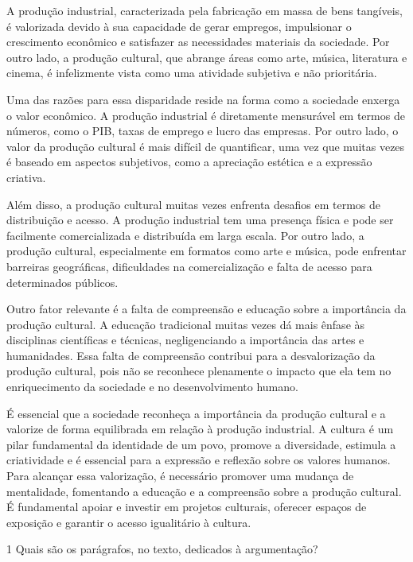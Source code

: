 \begin{itemize}
\begin{itemize}
{\begin{itemize}
\begin{itemize}
\begin{escolha}
\begin{escolha}
\begin{escolha}
\begin{escolha}
\begin{escolha}
\begin{escolha}
\begin{escolha}
\begin{escolha}
A produção industrial, caracterizada pela fabricação em massa de bens
tangíveis, é valorizada devido à sua capacidade de gerar empregos,
impulsionar o crescimento econômico e satisfazer as necessidades
materiais da sociedade. Por outro lado, a produção cultural, que abrange
áreas como arte, música, literatura e cinema, é infelizmente vista como
uma atividade subjetiva e não prioritária.

Uma das razões para essa disparidade reside na forma como a sociedade
enxerga o valor econômico. A produção industrial é diretamente
mensurável em termos de números, como o PIB, taxas de emprego e lucro
das empresas. Por outro lado, o valor da produção cultural é mais
difícil de quantificar, uma vez que muitas vezes é baseado em aspectos
subjetivos, como a apreciação estética e a expressão criativa.

Além disso, a produção cultural muitas vezes enfrenta desafios em termos
de distribuição e acesso. A produção industrial tem uma presença física
e pode ser facilmente comercializada e distribuída em larga escala. Por
outro lado, a produção cultural, especialmente em formatos como arte e
música, pode enfrentar barreiras geográficas, dificuldades na
comercialização e falta de acesso para determinados públicos.

Outro fator relevante é a falta de compreensão e educação sobre a
importância da produção cultural. A educação tradicional muitas vezes dá
mais ênfase às disciplinas científicas e técnicas, negligenciando a
importância das artes e humanidades. Essa falta de compreensão contribui
para a desvalorização da produção cultural, pois não se reconhece
plenamente o impacto que ela tem no enriquecimento da sociedade e no
desenvolvimento humano.

É essencial que a sociedade reconheça a importância da produção cultural
e a valorize de forma equilibrada em relação à produção industrial. A
cultura é um pilar fundamental da identidade de um povo, promove a
diversidade, estimula a criatividade e é essencial para a expressão e
reflexão sobre os valores humanos. Para alcançar essa valorização, é
necessário promover uma mudança de mentalidade, fomentando a educação e
a compreensão sobre a produção cultural. É fundamental apoiar e investir
em projetos culturais, oferecer espaços de exposição e garantir o acesso
igualitário à cultura.

\num{1} Quais são os parágrafos, no texto, dedicados à argumentação?

\end{escolha}
\end{escolha}
\end{escolha}
\end{escolha}
\end{escolha}
\end{escolha}
\end{escolha}
\end{escolha}
\end{itemize}
\end{itemize}}
\end{itemize}
\end{itemize}
